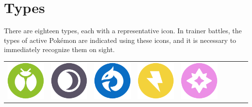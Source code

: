 \chapter{Types}
\label{chap:types}
There are eighteen types, each with a representative icon.
In trainer battles, the types of active Pokémon are indicated
 using these icons, and it is necessary to immediately recognize
 them on sight.

\begin{table}[h!]
  \begin{center}
  \begin{tabular}{c c c c c c c c c}
  \includegraphics[scale=.25]{images/bug.png} &
  \includegraphics[scale=.25]{images/dark.png} &
  \includegraphics[scale=.25]{images/dragon.png} &
  \includegraphics[scale=.25]{images/electric.png} &
  \includegraphics[scale=.25]{images/fairy.png} &

\end{tabular}
\end{center}
\end{table}
